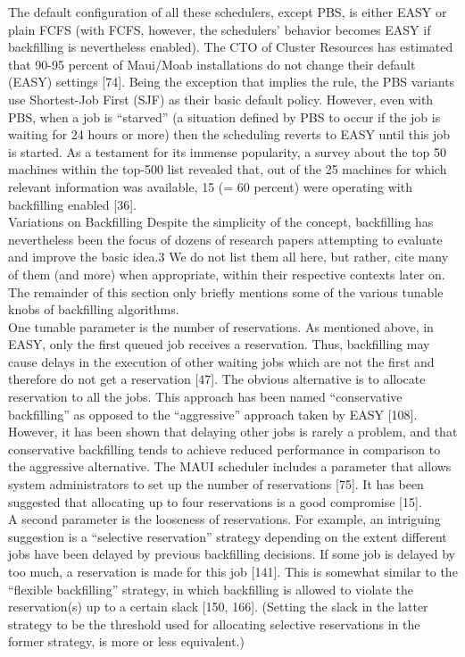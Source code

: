 The default configuration of all these schedulers, except PBS, is either EASY or plain FCFS (with FCFS, however, the schedulers’ behavior becomes EASY if backfilling is nevertheless enabled). The CTO of Cluster Resources has estimated that 90-95 percent of Maui/Moab installations do
not change their default (EASY) settings [74]. Being the exception that implies the rule, the PBS variants use Shortest-Job First (SJF) as their basic default policy. However, even with PBS, when a job is “starved” (a situation defined by PBS to occur if the job is waiting for 24 hours or more) then the scheduling reverts to EASY until this job is started. As a testament for its immense popularity, a survey about the top 50 machines within the top-500 list revealed that, out of the 25 machines for which relevant information was available, 15 (= 60 percent) were operating with backfilling enabled [36].\\

Variations on Backfilling Despite the simplicity of the concept, backfilling has nevertheless been the focus of dozens of research papers attempting to evaluate and improve the basic idea.3 We do not list them all here, but rather, cite many of them (and more) when appropriate, within
their respective contexts later on. The remainder of this section only briefly mentions some of the various tunable knobs of backfilling algorithms.\\

One tunable parameter is the number of reservations. As mentioned above, in EASY, only the first queued job receives a reservation. Thus, backfilling may cause delays in the execution of other waiting jobs which are not the first and therefore do not get a reservation [47]. The obvious
alternative is to allocate reservation to all the jobs. This approach has been named “conservative backfilling” as opposed to the “aggressive” approach taken by EASY [108]. However, it has been shown that delaying other jobs is rarely a problem, and that conservative backfilling tends
to achieve reduced performance in comparison to the aggressive alternative. The MAUI scheduler includes a parameter that allows system administrators to set up the number of reservations [75]. It has been suggested that allocating up to four reservations is a good compromise [15].\\

A second parameter is the looseness of reservations. For example, an intriguing suggestion is a “selective reservation” strategy depending on the extent different jobs have been delayed by previous backfilling decisions. If some job is delayed by too much, a reservation is made for this job [141]. This is somewhat similar to the “flexible backfilling” strategy, in which backfilling is allowed to violate the reservation(s) up to a certain slack [150, 166]. (Setting the slack in the latter strategy to be the threshold used for allocating selective reservations in the former strategy, is more or less equivalent.)\\

